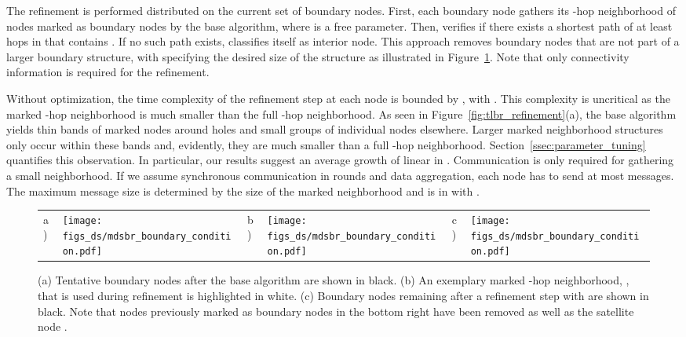 \documentclass{llncs}
\begin{document}
The refinement is performed distributed on the current set of boundary nodes.
First, each boundary node  gathers its -hop neighborhood  of nodes marked as boundary nodes by the base algorithm, where  is a free parameter.
Then,  verifies if there exists a shortest path of at least  hops in  that contains .
If no such path exists,  classifies itself as interior node.
This approach removes boundary nodes that are not part of a larger boundary structure, with  specifying the desired size of the structure as illustrated in Figure~\ref{fig:tlbr_refinement2}.
Note that only connectivity information is required for the refinement.

Without optimization, the time complexity of the refinement step at each node  is bounded by , with .
This complexity is uncritical as the marked -hop neighborhood  is much smaller than the full -hop neighborhood.
As seen in Figure~\ref{fig:tlbr_refinement}(a), the base algorithm yields thin bands of marked nodes around holes and small groups of individual nodes elsewhere.
Larger marked neighborhood structures only occur within these bands and, evidently, they are much smaller than a full -hop neighborhood.
Section~\ref{ssec:parameter_tuning} quantifies this observation.
In particular, our results suggest an average growth of  linear in .
Communication is only required for gathering a small neighborhood.
If we assume synchronous communication in rounds and data aggregation, each node has to send at most  messages.
The maximum message size is determined by the size of the marked neighborhood and is in  with .

\begin{figure}[t]
\centering
\begin{tabular}{llllll}
a) \hspace{0.2cm} &
\parbox[c]{.25\columnwidth}{\texttt{[image: figs\_ds/mdsbr\_boundary\_condition.pdf]}} &
\hspace{0.5cm}  b) \hspace{0.2cm} &
\parbox[c]{.25\columnwidth}{\texttt{[image: figs\_ds/mdsbr\_boundary\_condition.pdf]}} &
\hspace{0.5cm}  c) \hspace{0.2cm} &
\parbox[c]{.25\columnwidth}{\texttt{[image: figs\_ds/mdsbr\_boundary\_condition.pdf]}}
\end{tabular}
\caption{(a) Tentative boundary nodes after the base algorithm are shown in black. (b) An exemplary marked -hop neighborhood, , that is used during refinement is highlighted in white. (c) Boundary nodes remaining after a refinement step with  are shown in black. Note that nodes previously marked as boundary nodes in the bottom right have been removed as well as the satellite node .}\label{fig:tlbr_refinement2}
\end{figure}
\end{document}
